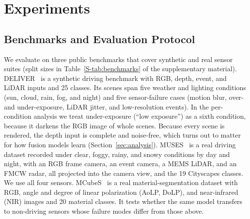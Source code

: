 \section{Experiments}\label{sec:exp}
\subsection{Benchmarks and Evaluation Protocol}\label{sec:sensors}
We evaluate on three public benchmarks that cover synthetic and real sensor suites (split sizes in Table~\ref{S-tab:benchmarks} of the supplementary material).
DELIVER~\cite{cmnext2023} is a synthetic driving benchmark with RGB, depth, event, and LiDAR inputs and 25 classes. Its scenes span five weather and lighting conditions (sun, cloud, rain, fog, and night) and five sensor-failure cases (motion blur, over- and under-exposure, LiDAR jitter, and low-resolution events). In the per-condition analysis we treat under-exposure (``low exposure'') as a sixth condition, because it darkens the RGB image of whole scenes. Because every scene is rendered, the depth input is complete and noise-free, which turns out to matter for how fusion models learn (Section~\ref{sec:analysis}).
MUSES~\cite{muses2024} is a real driving dataset recorded under clear, foggy, rainy, and snowy conditions by day and night, with an RGB frame camera, an event camera, a MEMS LiDAR, and an FMCW radar, all projected into the camera view, and the 19 Cityscapes classes. We use all four sensors.
MCubeS~\cite{mcubes2022} is a real material-segmentation dataset with RGB, angle and degree of linear polarization (AoLP, DoLP), and near-infrared (NIR) images and 20 material classes. It tests whether the same model transfers to non-driving sensors whose failure modes differ from those above.

